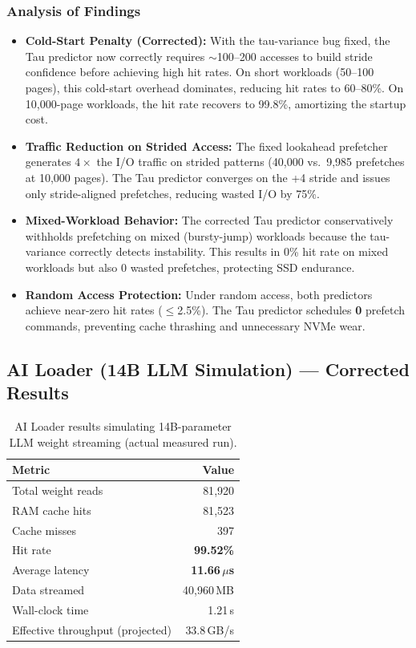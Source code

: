 \documentclass[11pt,a4paper]{article}
\newcommand{\micro}{$\mu$}
\begin{document}
\subsubsection{Analysis of Findings}
\begin{itemize}
    \item \textbf{Cold-Start Penalty (Corrected):} With the tau-variance bug fixed, the Tau predictor now correctly requires $\sim$100--200 accesses to build stride confidence before achieving high hit rates. On short workloads (50--100 pages), this cold-start overhead dominates, reducing hit rates to 60--80\%. On 10{,}000-page workloads, the hit rate recovers to 99.8\%, amortizing the startup cost.
    \item \textbf{Traffic Reduction on Strided Access:} The fixed lookahead prefetcher generates $4\times$ the I/O traffic on strided patterns (40{,}000 vs.\ 9{,}985 prefetches at 10{,}000 pages). The Tau predictor converges on the +4 stride and issues only stride-aligned prefetches, reducing wasted I/O by 75\%.
    \item \textbf{Mixed-Workload Behavior:} The corrected Tau predictor conservatively withholds prefetching on mixed (bursty-jump) workloads because the tau-variance correctly detects instability. This results in 0\% hit rate on mixed workloads but also 0 wasted prefetches, protecting SSD endurance.
    \item \textbf{Random Access Protection:} Under random access, both predictors achieve near-zero hit rates ($\leq$2.5\%). The Tau predictor schedules \textbf{0} prefetch commands, preventing cache thrashing and unnecessary NVMe wear.
\end{itemize}

\subsection{AI Loader (14B LLM Simulation) --- Corrected Results}

\begin{table}[htbp]
\centering
\caption{AI Loader results simulating 14B-parameter LLM weight streaming (actual measured run).}
\label{tab:ailoader}
\begin{tabular}{lr}
\toprule
\textbf{Metric} & \textbf{Value} \\
\midrule
Total weight reads & 81{,}920 \\
RAM cache hits & 81{,}523 \\
Cache misses & 397 \\
Hit rate & \textbf{99.52\%} \\
Average latency & \textbf{11.66\,\micro{}s} \\
Data streamed & 40{,}960\,MB \\
Wall-clock time & 1.21\,s \\
Effective throughput (projected) & 33.8\,GB/s \\
\bottomrule
\end{tabular}
\end{table}
\end{document}
